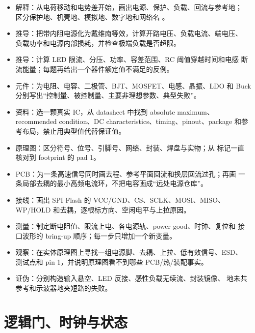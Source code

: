 \begin{itemize}
  \item 解释：从电荷移动和电势差开始，画出电源、保护、负载、回流与参考地；
        区分保护地、机壳地、模拟地、数字地和网络名 。
  \item 推导：把带内阻电源化为戴维南等效，计算开路电压、负载电流、端电压、
        负载功率和电源内部损耗，并检查极端负载是否超限。
  \item 推导：计算 LED 限流、分压、功率、容差范围、RC 阈值穿越时间和电感
        断流能量；每题再给出一个器件额定值不满足的反例。
  \item 元件：为电阻、电容、二极管、BJT、MOSFET、电感、晶振、LDO 和 Buck
        分别写出“控制量、被控制量、主要非理想参数、典型失败”。
  \item 资料：选一颗真实 IC，从 datasheet 中找到 absolute maximum、
        recommended condition、DC characteristics、timing、pinout、package
        和参考布局，禁止用典型值代替保证值。
  \item 原理图：区分符号、位号、引脚号、网络、封装、焊盘与实物；从
         标记一直核对到 footprint 的 pad 1。
  \item PCB：为一条高速信号同时画去程、参考平面回流和换层回流过孔；再画
        一条局部去耦的最小高频电流环，不把电容画成“远处电源仓库”。
  \item 接线：画出 SPI Flash 的 VCC/GND、CS、SCLK、MOSI、MISO、
        WP/HOLD 和去耦，逐根标方向、空闲电平与上拉原因。
  \item 测量：制定断电阻值、限流上电、各电源轨、power-good、时钟、复位和
        接口波形的 bring-up 顺序；每一步只增加一个新变量。
  \item 观察：在实体原理图上寻找一组电源脚、去耦、上拉、低有效信号、ESD、
        测试点和 pin 1，并说明原理图看不到哪些 PCB/热/装配事实。
  \item 证伪：分别构造输入悬空、LED 反接、感性负载无续流、封装镜像、
        地未共参考和示波器地夹短路的失败。
\end{itemize}

\section*{逻辑门、时钟与状态}

